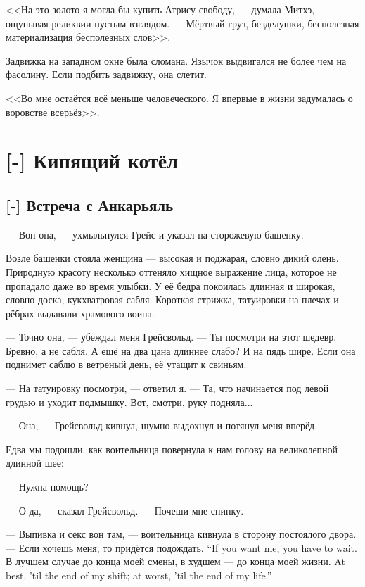 \asterism

<<На это золото я могла бы купить Атрису свободу, --- думала Митхэ, ощупывая реликвии пустым взглядом.
--- Мёртвый груз, безделушки, бесполезная материализация бесполезных слов>>.

Задвижка на западном окне была сломана.
Язычок выдвигался не более чем на фасолину.
Если подбить задвижку, она слетит.

<<Во мне остаётся всё меньше человеческого.
Я впервые в жизни задумалась о воровстве всерьёз>>.


\chapter{[-] Кипящий котёл}

\section{[-] Встреча с Анкарьяль}

--- Вон она, --- ухмыльнулся Грейс и указал на сторожевую башенку.

Возле башенки стояла женщина --- высокая и поджарая, словно дикий олень.
Природную красоту несколько оттеняло хищное выражение лица, которое не пропадало даже во время улыбки.
У её бедра покоилась длинная и широкая, словно доска, кукхватровая сабля.
Короткая стрижка, татуировки на плечах и рёбрах выдавали храмового воина.

--- Точно она, --- убеждал меня Грейсвольд.
--- Ты посмотри на этот шедевр.
Бревно, а не сабля.
А ещё на два цана длиннее слабо?
И на пядь шире.
Если она поднимет саблю в ветреный день, её утащит к свиньям.

--- На татуировку посмотри, --- ответил я.
--- Та, что начинается под левой грудью и уходит подмышку.
Вот, смотри, руку подняла...

--- Она, --- Грейсвольд кивнул, шумно выдохнул и потянул меня вперёд.

Едва мы подошли, как воительница повернула к нам голову на великолепной длинной шее:

--- Нужна помощь?

--- О да, --- сказал Грейсвольд.
--- Почеши мне спинку.

--- Выпивка и секс вон там, --- воительница кивнула в сторону постоялого двора.
{--- Если хочешь меня, то придётся подождать.}
{``If you want me, you have to wait.}
{В лучшем случае до конца моей смены, в худшем --- до конца моей жизни.}
{At best, 'til the end of my shift; at worst, 'til the end of my life.''}

